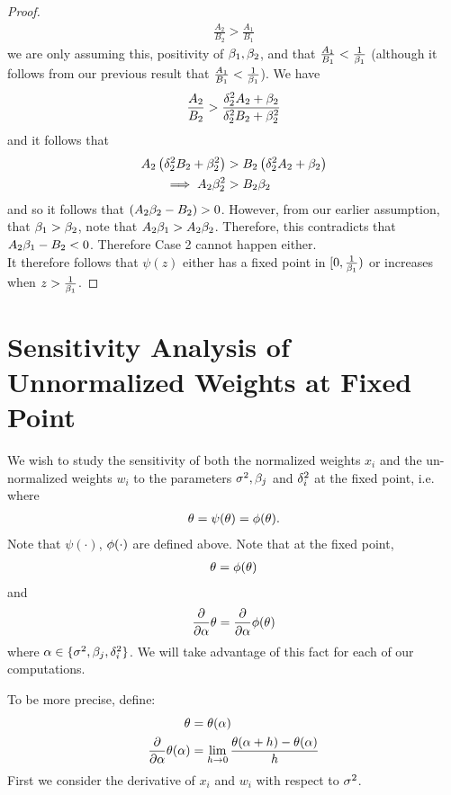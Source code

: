 \documentclass[12pt,leqno,letterpaper]{article}
\begin{document}
\begin{proof}
\begin{align}
\frac{A_2}{B_2}> \frac{A_1}{B_1}
\end{align}
we are only assuming this, positivity of $\beta_1, \beta_2$, and that $\frac{A_1}{B_1}< \frac{1}{\beta_1}$ (although it follows from our previous result that $\frac{A_1}{B_1}< \frac{1}{\beta_1}$).  We have
\begin{align}
\frac{A_2}{B_2}>\frac{\delta_2^2 A_2 + \beta_2}{\delta_2^2 B_2 + \beta_2^2}
\end{align}
and it follows that
\begin{align}
A_2 \left(\delta_2^2 B_2 + \beta_2^2\right) &> B_2\left(\delta_2^2 A_2 + \beta_2\right) \\
\implies A_2 \beta_2^2  &> B_2  \beta_2
\end{align}
and so it follows that $\left(A_2 \beta_2 - B_2\right)>0$.  However, from our earlier assumption, that $\beta_1>\beta_2$, note that $A_2 \beta_1 > A_2 \beta_2$.  Therefore, this contradicts that $A_2 \beta_1-B_2<0$.  Therefore Case 2 cannot happen either.\\
It therefore follows that $\psi(z)$ either has a fixed point in $[0,\frac{1}{\beta_1})$ or increases when $z> \frac{1}{\beta_1}$.
\end{proof}
\newpage
\section{Sensitivity Analysis of Unnormalized Weights at Fixed Point}
We wish to study the sensitivity of both the normalized weights $x_i$ and the un-normalized weights $w_i$ to the parameters $\sigma^2,\beta_j$ and $\delta_i^2$ at the fixed point, i.e. where 
\begin{align}
\theta = \psi(\theta)= \phi(\theta).
\end{align}
Note that $\psi(\cdot)$, $\phi(\cdot)$ are defined above.  Note that at the fixed point, 
\begin{align}
\theta=\phi(\theta)
\end{align}
and 
\begin{align}
\frac{\partial }{ \partial {\alpha}} \theta = \frac{\partial }{ \partial {\alpha}} \phi(\theta)
\end{align}
where $\alpha \in \{\sigma^2, \beta_j, \delta_i^2 \}$.  We will take advantage of this fact for each of our computations.\par
To be more precise, define:
\begin{align}
\theta &= \theta(\alpha)\\
\frac{\partial }{ \partial {\alpha}} \theta(\alpha) &= \lim_{h \to 0} \frac{\theta(\alpha+h)-\theta(\alpha)}{h}
\end{align}
First we consider the derivative of $x_i$ and $w_i$ with respect to $\sigma^2$.
\newpage
\end{document}
